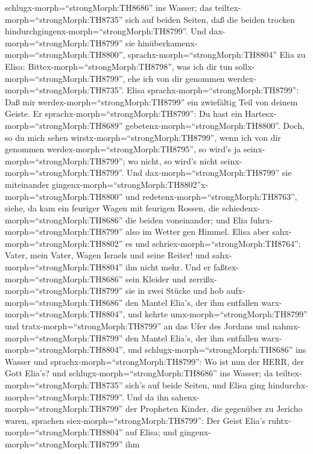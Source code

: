 schlugx-morph=``strongMorph:TH8686'' ins Wasser; das
teiltex-morph=``strongMorph:TH8735'' sich auf beiden Seiten, daß die
beiden trocken hindurchgingenx-morph=``strongMorph:TH8799''.
 Und dax-morph=``strongMorph:TH8799'' sie
hinüberkamenx-morph=``strongMorph:TH8800'',
sprachx-morph=``strongMorph:TH8804'' Elia zu Elisa:
Bittex-morph=``strongMorph:TH8798'', was ich dir tun
sollx-morph=``strongMorph:TH8799'', ehe ich von dir genommen
werdex-morph=``strongMorph:TH8735''. Elisa
sprachx-morph=``strongMorph:TH8799'': Daß mir
werdex-morph=``strongMorph:TH8799'' ein zwiefältig Teil von deinem
Geiste.  Er sprachx-morph=``strongMorph:TH8799'': Du hast
ein Hartesx-morph=``strongMorph:TH8689''
gebetenx-morph=``strongMorph:TH8800''. Doch, so du mich sehen
wirstx-morph=``strongMorph:TH8799'', wenn ich von dir genommen
werdex-morph=``strongMorph:TH8795'', so wird's ja
seinx-morph=``strongMorph:TH8799''; wo nicht, so wird's nicht
seinx-morph=``strongMorph:TH8799''.  Und
dax-morph=``strongMorph:TH8799'' sie miteinander
gingenx-morph=``strongMorph:TH8802''x-morph=``strongMorph:TH8800'' und
redetenx-morph=``strongMorph:TH8763'', siehe, da kam ein feuriger Wagen
mit feurigen Rossen, die schiedenx-morph=``strongMorph:TH8686'' die
beiden voneinander; und Elia fuhrx-morph=``strongMorph:TH8799'' also im
Wetter gen Himmel.  Elisa aber
sahx-morph=``strongMorph:TH8802'' es und
schriex-morph=``strongMorph:TH8764'': Vater, mein Vater, Wagen Israels
und seine Reiter! und sahx-morph=``strongMorph:TH8804'' ihn nicht mehr.
Und er faßtex-morph=``strongMorph:TH8686'' sein Kleider und
zerrißx-morph=``strongMorph:TH8799'' sie in zwei Stücke 
und hob aufx-morph=``strongMorph:TH8686'' den Mantel Elia's, der ihm
entfallen warx-morph=``strongMorph:TH8804'', und kehrte
umx-morph=``strongMorph:TH8799'' und tratx-morph=``strongMorph:TH8799''
an das Ufer des Jordans  und
nahmx-morph=``strongMorph:TH8799'' den Mantel Elia's, der ihm entfallen
warx-morph=``strongMorph:TH8804'', und
schlugx-morph=``strongMorph:TH8686'' ins Wasser und
sprachx-morph=``strongMorph:TH8799'': Wo ist nun der HERR, der Gott
Elia's? und schlugx-morph=``strongMorph:TH8686'' ins Wasser; da
teiltex-morph=``strongMorph:TH8735'' sich's auf beide Seiten, und Elisa
ging hindurchx-morph=``strongMorph:TH8799''.  Und da ihn
sahenx-morph=``strongMorph:TH8799'' der Propheten Kinder, die gegenüber
zu Jericho waren, sprachen siex-morph=``strongMorph:TH8799'': Der Geist
Elia's ruhtx-morph=``strongMorph:TH8804'' auf Elisa; und
gingenx-morph=``strongMorph:TH8799'' ihm
